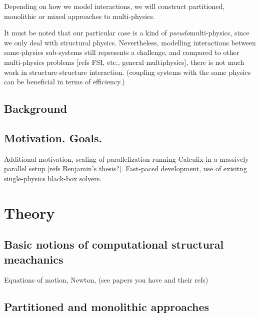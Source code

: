 \documentclass[a4paper, 11pt, oneside]{Thesis}  %
\begin{document}

Depending on how we model interactions, we will construct partitioned, monolithic or mixed approaches to multi-physics. %

It must be noted that our particular case is a kind of \textit{pseudo}multi-physics, since we only deal with structural physics. Nevertheless, modelling interactions between same-physics sub-systems still represents a challenge, and compared to other multi-physics problems [refs FSI, etc., general multiphysics], there is not much work in structure-structure interaction.
(coupling systems with the same physics can be beneficial in terms of efficiency.)




\section{Background}

\section{Motivation. Goals.}

Additional motivation, scaling of parallelization running Calculix in a massively parallel setup [refs Benjamin's thesis?].
Fast-paced development, use of exisitng single-physics black-box solvers.



\chapter{Theory}

\section{Basic notions of computational structural meachanics}

Equations of motion, Newton, (see papers you have and their refs)

\section{Partitioned and monolithic approaches}
\end{document}
